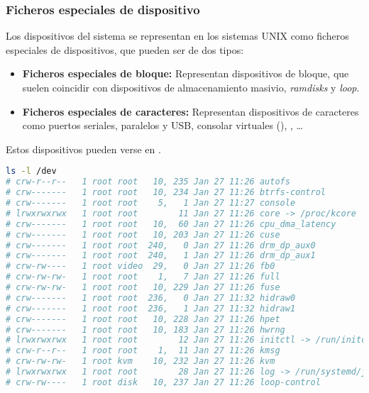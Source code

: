\pagebreak

\subsubsection{Ficheros especiales de dispositivo}

Los dispositivos del sistema se representan en los sistemas UNIX como ficheros especiales de dispositivos, que pueden ser de dos tipos:

\begin{itemize}
	\item\textbf{Ficheros especiales de bloque:} Representan dispositivos de bloque, que suelen coincidir con dispositivos de almacenamiento masivio, \emph{ramdisks} y \emph{loop}.
	\item\textbf{Ficheros especiales de caracteres:} Representan dispositivos de caracteres como puertos seriales, paralelos y USB, consolar virtuales (), , \ldots
\end{itemize}

Estos dispositivos pueden verse en .

\begin{lstlisting}[language=Bash]
ls -l /dev
# crw-r--r--   1 root root   10, 235 Jan 27 11:26 autofs
# crw-------   1 root root   10, 234 Jan 27 11:26 btrfs-control
# crw-------   1 root root    5,   1 Jan 27 11:27 console
# lrwxrwxrwx   1 root root        11 Jan 27 11:26 core -> /proc/kcore
# crw-------   1 root root   10,  60 Jan 27 11:26 cpu_dma_latency
# crw-------   1 root root   10, 203 Jan 27 11:26 cuse
# crw-------   1 root root  240,   0 Jan 27 11:26 drm_dp_aux0
# crw-------   1 root root  240,   1 Jan 27 11:26 drm_dp_aux1
# crw-rw----   1 root video  29,   0 Jan 27 11:26 fb0
# crw-rw-rw-   1 root root    1,   7 Jan 27 11:26 full
# crw-rw-rw-   1 root root   10, 229 Jan 27 11:26 fuse
# crw-------   1 root root  236,   0 Jan 27 11:32 hidraw0
# crw-------   1 root root  236,   1 Jan 27 11:32 hidraw1
# crw-------   1 root root   10, 228 Jan 27 11:26 hpet
# crw-------   1 root root   10, 183 Jan 27 11:26 hwrng
# lrwxrwxrwx   1 root root        12 Jan 27 11:26 initctl -> /run/initctl
# crw-r--r--   1 root root    1,  11 Jan 27 11:26 kmsg
# crw-rw-rw-   1 root kvm    10, 232 Jan 27 11:26 kvm
# lrwxrwxrwx   1 root root        28 Jan 27 11:26 log -> /run/systemd/journal/dev-log
# crw-rw----   1 root disk   10, 237 Jan 27 11:26 loop-control
\end{lstlisting}

